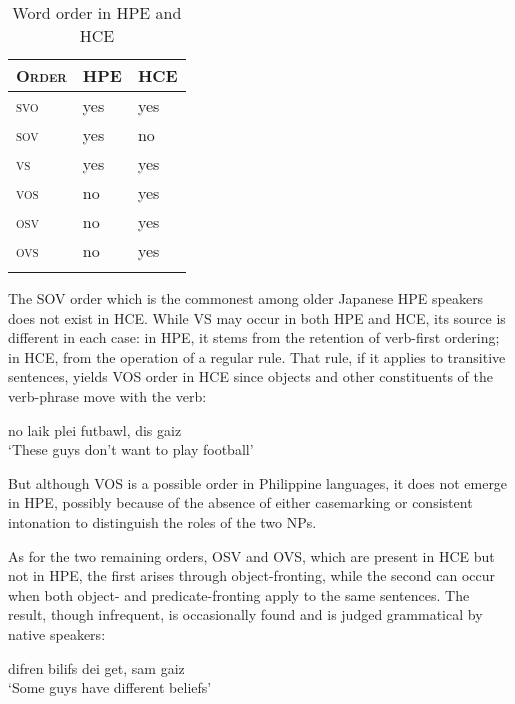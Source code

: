 \begin{table}
\begin{tabular}{>{\scshape}lll}
\lsptoprule
\rm Order & HPE & HCE\\
\midrule
svo  & yes &  yes\\
sov  & yes  &  no\\
vs  & yes  & yes\\
vos  & no & yes\\
osv  & no &  yes\\
ovs  & no &  yes\\
\lspbottomrule
\end{tabular}
\caption{Word order in HPE and HCE}
\label{tab:1.1}
\end{table}

The SOV order which is the commonest among older Japanese HPE speakers does not exist in HCE. While VS may occur in both HPE and HCE, its source is different in each case: in HPE, it stems from the retention of verb-first ordering; in HCE, from the operation of a regular rule. That rule, if it applies to transitive sentences, yields VOS order in HCE since objects and other constituents of the verb-phrase move
with the verb:



\ea\label{ex:27}
 no laik plei futbawl, dis gaiz\\
\glt  `These guys don't want to play football'
\z

\noindent But although VOS is a possible order in Philippine languages, it does not emerge in HPE, possibly because of the absence of either case\-marking or consistent intonation to distinguish the roles of the two NPs.

As for the two remaining orders, OSV and OVS, which are present in HCE but not in HPE, the first arises through object-fronting, while the second can occur when both object- and predicate-fronting apply to the same sentences. The result, though infrequent, is occasion\-ally found and is judged grammatical by native speakers:

\ea\label{ex:28}
 difren bilifs dei get, sam gaiz \\
\glt  `Some guys have different beliefs'
\z

